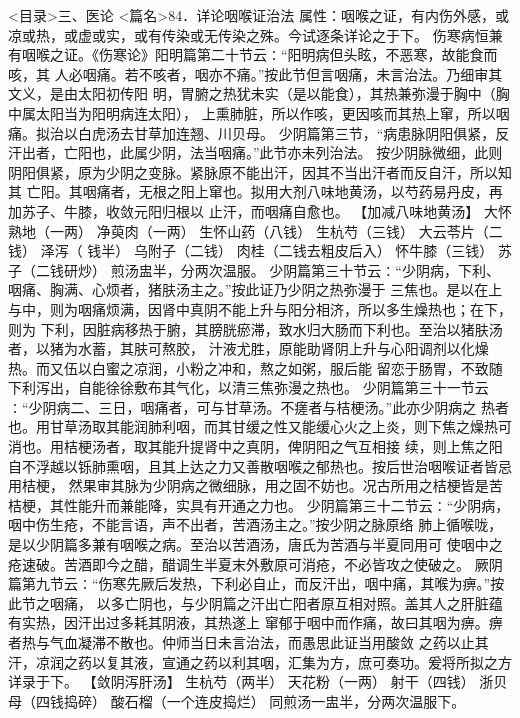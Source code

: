 \documentclass[a4paper,12pt,UTF8,twoside]{ctexbook}
\begin{document}
<目录>三、医论
<篇名>84．详论咽喉证治法
属性：咽喉之证，有内伤外感，或凉或热，或虚或实，或有传染或无传染之殊。今试逐条详论之于下。 
伤寒病恒兼有咽喉之证。《伤寒论》阳明篇第二十节云∶“阳明病但头眩，不恶寒，故能食而咳，其 
人必咽痛。若不咳者，咽亦不痛。”按此节但言咽痛，未言治法。乃细审其文义，是由太阳初传阳 
明，胃腑之热犹未实（是以能食），其热兼弥漫于胸中（胸中属太阳当为阳明病连太阳）， 
上熏肺脏，所以作咳，更因咳而其热上窜，所以咽痛。拟治以白虎汤去甘草加连翘、川贝母。 
少阴篇第三节，“病患脉阴阳俱紧，反汗出者，亡阳也，此属少阴，法当咽痛。”此节亦未列治法。 
按少阴脉微细，此则阴阳俱紧，原为少阴之变脉。紧脉原不能出汗，因其不当出汗者而反自汗，所以知其 
亡阳。其咽痛者，无根之阳上窜也。拟用大剂八味地黄汤，以芍药易丹皮，再加苏子、牛膝，收敛元阳归根以 
止汗，而咽痛自愈也。 
【加减八味地黄汤】 
大怀熟地（一两） 净萸肉（一两） 生怀山药（八钱） 生杭芍（三钱） 大云苓片（二钱） 泽泻（ 
钱半） 乌附子（二钱） 肉桂（二钱去粗皮后入） 怀牛膝（三钱） 苏子（二钱研炒） 
煎汤盅半，分两次温服。 
少阴篇第三十节云∶“少阴病，下利、咽痛、胸满、心烦者，猪肤汤主之。”按此证乃少阴之热弥漫于 
三焦也。是以在上与中，则为咽痛烦满，因肾中真阴不能上升与阳分相济，所以多生燥热也；在下，则为 
下利，因脏病移热于腑，其膀胱瘀滞，致水归大肠而下利也。至治以猪肤汤者，以猪为水蓄，其肤可熬胶， 
汁液尤胜，原能助肾阴上升与心阳调剂以化燥热。而又伍以白蜜之凉润，小粉之冲和，熬之如粥，服后能 
留恋于肠胃，不致随下利泻出，自能徐徐敷布其气化，以清三焦弥漫之热也。 
少阴篇第三十一节云∶“少阴病二、三日，咽痛者，可与甘草汤。不瘥者与桔梗汤。”此亦少阴病之 
热者也。用甘草汤取其能润肺利咽，而其甘缓之性又能缓心火之上炎，则下焦之燥热可 
消也。用桔梗汤者，取其能升提肾中之真阴，俾阴阳之气互相接 
续，则上焦之阳自不浮越以铄肺熏咽，且其上达之力又善散咽喉之郁热也。按后世治咽喉证者皆忌用桔梗， 
然果审其脉为少阴病之微细脉，用之固不妨也。况古所用之桔梗皆是苦桔梗，其性能升而兼能降，实具有开通之力也。 
少阴篇第三十二节云∶“少阴病，咽中伤生疮，不能言语，声不出者，苦酒汤主之。”按少阴之脉原络 
肺上循喉咙，是以少阴篇多兼有咽喉之病。至治以苦酒汤，唐氏为苦酒与半夏同用可 
使咽中之疮速破。苦酒即今之醋，醋调生半夏末外敷原可消疮，不必皆攻之使破之。 
厥阴篇第九节云∶“伤寒先厥后发热，下利必自止，而反汗出，咽中痛，其喉为痹。”按此节之咽痛， 
以多亡阴也，与少阴篇之汗出亡阳者原互相对照。盖其人之肝脏蕴有实热，因汗出过多耗其阴液，其热遂上 
窜郁于咽中而作痛，故曰其咽为痹。痹者热与气血凝滞不散也。仲师当日未言治法，而愚思此证当用酸敛 
之药以止其汗，凉润之药以复其液，宣通之药以利其咽，汇集为方，庶可奏功。爰将所拟之方详录于下。 
【敛阴泻肝汤】 
生杭芍（两半） 天花粉（一两） 射干（四钱） 浙贝母（四钱捣碎） 酸石榴（一个连皮捣烂） 
同煎汤一盅半，分两次温服下。 
\end{document}
